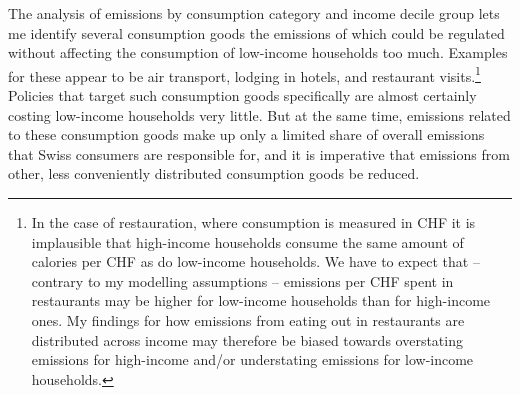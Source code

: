 \documentclass[a4paper,11pt,abstract=true]{scrartcl}
\begin{document}
The analysis of emissions by consumption category and income decile group lets me identify several consumption goods the emissions of which could be regulated without affecting the consumption of low-income households too much.
Examples for these appear to be air transport, lodging in hotels, and restaurant visits.\footnote{%
  In the case of restauration, where consumption is measured in CHF it is implausible that high-income households consume the same amount of calories per CHF as do low-income households.
  We have to expect that -- contrary to my modelling assumptions -- emissions per CHF spent in restaurants may be higher for low-income households than for high-income ones.
  My findings for how emissions from eating out in restaurants are distributed across income may therefore be biased towards overstating emissions for high-income and/or understating emissions for low-income households.
}
Policies that target such consumption goods specifically are almost certainly costing low-income households very little.
But at the same time, emissions related to these consumption goods make up only a limited share of overall emissions that Swiss consumers are responsible for, and it is imperative that emissions from other, less conveniently distributed consumption goods be reduced.
\end{document}
